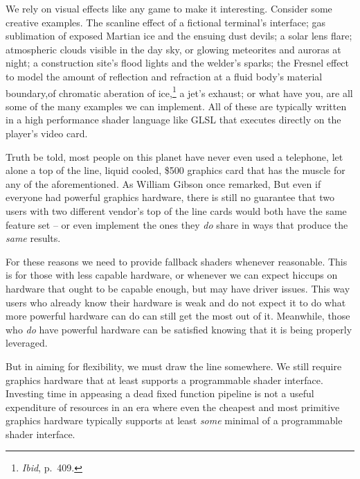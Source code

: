 We rely on visual effects like any game to make it interesting. Consider some creative examples. The scanline effect of a fictional terminal's interface; gas sublimation of exposed Martian ice and the ensuing dust devils; a solar lens flare; atmospheric  clouds visible in the day sky, or glowing meteorites and auroras at night; a construction site's flood lights and the welder's sparks; the Fresnel effect to model the amount of reflection and refraction at a fluid body's material boundary, of chromatic aberation of ice,\footnote{{\it Ibid}, p.~409.} a jet's exhaust; or what have you, are all some of the many examples we can implement. All of these are typically written in a high performance shader language like GLSL that executes directly on the player's video card.

Truth be told, most people on this planet have never even used a telephone, let alone a top of the line, liquid cooled, \$500 graphics card that has the muscle for any of the aforementioned. As William Gibson once remarked,  But even if everyone had powerful graphics hardware, there is still no guarantee that two users with two different vendor's top of the line cards would both have the same feature set -- or even implement the ones they {\it do} share in ways that produce the {\it same} results. 

For these reasons we need to provide fallback shaders whenever reasonable. This is for those with less capable hardware, or whenever we can expect hiccups on hardware that ought to be capable enough, but may have driver issues. This way users who already know their hardware is weak and do not expect it to do what more powerful hardware can do can still get the most out of it. Meanwhile, those who {\it do} have powerful hardware can be satisfied knowing that it is being properly leveraged.

But in aiming for flexibility, we must draw the line somewhere. We still require graphics hardware that at least supports a programmable shader interface. Investing time in appeasing a dead fixed function pipeline is not a useful expenditure of resources in an era where even the cheapest and most primitive graphics hardware typically supports at least {\it some} minimal of a programmable shader interface.


